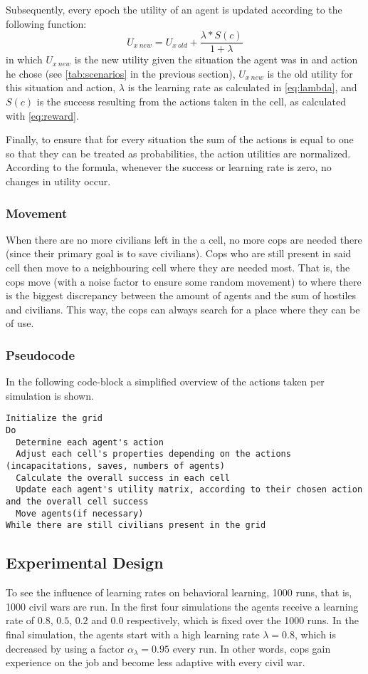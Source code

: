 Subsequently, every epoch the utility of an agent is updated according to the following function:
\begin{equation} \label{eq:utility}
U_{x~new} = U_{x~old} + \frac{\lambda * S(c)}{1+\lambda}
\end{equation}
in which $U_{x~new}$ is the new utility given the situation the agent was in and action he chose (see \autoref{tab:scenarios} in the previous section), $U_{x~new}$ is the old utility for this situation and action,
$\lambda$ is the learning rate as calculated in \autoref{eq:lambda}, and $S(c)$ is the success resulting from the actions taken in the cell, as calculated with \autoref{eq:reward}.

Finally, to ensure that for every situation the sum of the actions is equal to one so that they can be treated as probabilities, 
the action utilities are normalized.
According to the formula, whenever the success or learning rate is zero, no changes in utility occur.

\subsubsection{Movement}
When there are no more civilians left in the a cell, no more cops are needed there (since their primary goal is to save civilians).
Cops who are still present in said cell then move to a neighbouring cell where they are needed most.
That is, the cops move (with a noise factor to ensure some random movement) to where there is the biggest discrepancy between the amount of agents and the sum of hostiles and civilians.
This way, the cops can always search for a place where they can be of use.

\subsubsection{Pseudocode}
In the following code-block a simplified overview of the actions taken per simulation is shown.
\begin{lstlisting}
Initialize the grid
Do
  Determine each agent's action 
  Adjust each cell's properties depending on the actions (incapacitations, saves, numbers of agents)  
  Calculate the overall success in each cell
  Update each agent's utility matrix, according to their chosen action and the overall cell success
  Move agents(if necessary)
While there are still civilians present in the grid
\end{lstlisting}

\subsection{Experimental Design}
To see the influence of learning rates on behavioral learning, 1000 runs, that is, 1000 civil wars are run.
In the first four simulations the agents receive a learning rate of $0.8$, $0.5$, $0.2$ and $0.0$ respectively, which is fixed over the 1000 runs.
In the final simulation, the agents start with a high learning rate $\lambda = 0.8$, 
which is decreased by using a factor  $\alpha_\lambda = 0.95$ every run.
In other words, cops gain experience on the job and become less adaptive with every civil war.

